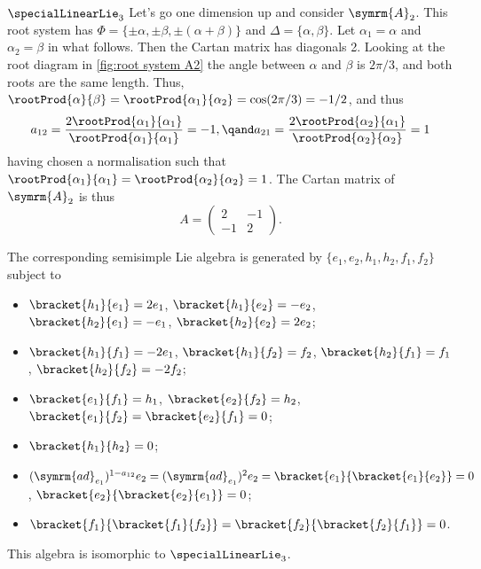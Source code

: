 \documentclass[fleqn]{NotesClass}
\newcommand{\ad}{\symrm{ad}}
\newcommand{\dynkin}[2]{\symrm{#1}_{#2}}
\begin{document}
    \begin{exm}{\(\specialLinearLie_3\)}{}
        Let's go one dimension up and consider \(\dynkin{A}{2}\).
        This root system has \(\Phi = \{\pm\alpha, \pm\beta, \pm(\alpha + \beta)\}\) and \(\Delta = \{\alpha, \beta\}\).
        Let \(\alpha_1 = \alpha\) and \(\alpha_2 = \beta\) in what follows.
        Then the Cartan matrix has diagonals 2.
        Looking at the root diagram in \cref{fig:root system A2} the angle between \(\alpha\) and \(\beta\) is \(2\pi/3\), and both roots are the same length.
        Thus, \(\rootProd{\alpha}{\beta} = \rootProd{\alpha_1}{\alpha_2} = \cos(2\pi/3) = -1/2\), and thus
        \begin{equation}
            a_{12} = \frac{2\rootProd{\alpha_1}{\alpha_1}}{\rootProd{\alpha_1}{\alpha_1}} = -1, \qand a_{21} = \frac{2\rootProd{\alpha_2}{\alpha_1}}{\rootProd{\alpha_2}{\alpha_2}} = 1 
        \end{equation}
        having chosen a normalisation such that \(\rootProd{\alpha_1}{\alpha_1} = \rootProd{\alpha_2}{\alpha_2} = 1\).
        The Cartan matrix of \(\dynkin{A}{2}\) is thus
        \begin{equation}
            A = 
            \begin{pmatrix}
                2 & -1\\
                -1 & 2
            \end{pmatrix}
            .
        \end{equation}
        
        The corresponding semisimple Lie algebra is generated by \(\{e_1, e_2, h_1, h_2, f_1, f_2\}\) subject to
        \begin{itemize}
            \item \(\bracket{h_1}{e_1} = 2e_1\), \(\bracket{h_1}{e_2} = -e_2\), \(\bracket{h_2}{e_1} = -e_1\), \(\bracket{h_2}{e_2} = 2e_2\);
            \item \(\bracket{h_1}{f_1} = -2e_1\), \(\bracket{h_1}{f_2} = f_2\), \(\bracket{h_2}{f_1} = f_1\), \(\bracket{h_2}{f_2} = -2f_2\);
            \item \(\bracket{e_1}{f_1} = h_1\), \(\bracket{e_2}{f_2} = h_2\), \(\bracket{e_1}{f_2} = \bracket{e_2}{f_1} = 0\);
            \item \(\bracket{h_1}{h_2} = 0\);
            \item \((\ad_{e_1})^{1 - a_{12}}e_2 = (\ad_{e_1})^2e_2 = \bracket{e_1}{\bracket{e_1}{e_2}} = 0\), \(\bracket{e_2}{\bracket{e_2}{e_1}} = 0\);
            \item \(\bracket{f_1}{\bracket{f_1}{f_2}} = \bracket{f_2}{\bracket{f_2}{f_1}} = 0\).
        \end{itemize}
        This algebra is isomorphic to \(\specialLinearLie_3\).
    \end{exm}
    
\end{document}
